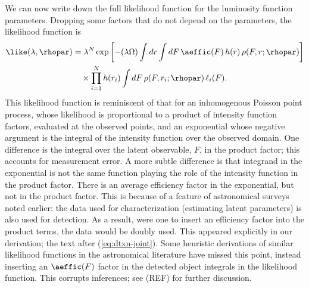 We can now write down the full likelihood function for the luminosity function parameters.
Dropping some factors that do not depend on the parameters, the likelihood function is
\begin{equation}\label{eq:like}
\begin{split}
\like(\lambda, \rhopar)
  &= \lambda^N \exp\left[- (\lambda \Omega) \int dr \int dF\,
            \aeffic(F)\, h(r)\, \rho(F,r;\rhopar)\right]\\
  &\quad\times \prod_{i=1}^N h(r_i) \int dF\, \rho(F,r_i;\rhopar)\, \ell_i(F).
\end{split}
\end{equation}
This likelihood function is reminiscent of that for an inhomogenous Poisson point process, whose likelihood is proportional to a product of intensity function factors, evaluated at the observed points, and an exponential whose negative argument is the integral of the intensity function over the observed domain.
One difference is the integral over the latent observable, $F$, in the product factor; this accounts for measurement error.
A more subtle difference is that integrand in the exponential is not the same function playing the role of the intensity function in the product factor.
There is an average efficiency factor in the exponential, but not in the product factor.
This is because of a feature of astronomical surveys noted earlier: the data used for characterization (estimating latent parameters) is also used for detection.
As a result, were one to insert an efficiency factor into the product terms, the data would be doubly used.
This appeared explicitly in our derivation; the text after (\ref{eq:dtxn-joint}).
Some heuristic derivations of similar likelihood functions in the astronomical literature have missed this point, instead inserting an $\aeffic(F)$ factor in the detected object integrals in the likelihood function.
This corrupts inferences; see (REF) for further discussion.


